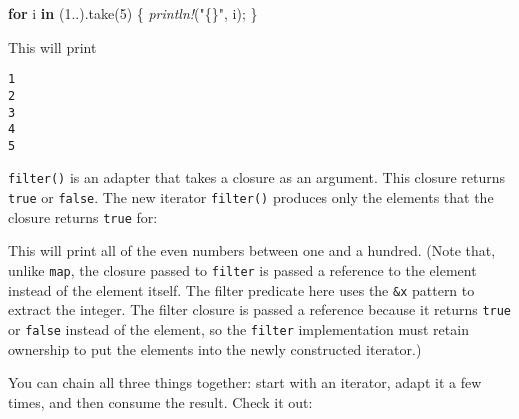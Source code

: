 \documentclass[a4paper,]{book}
\newenvironment{Shaded}{\begin{snugshade}}{\end{snugshade}}
\newcommand{\KeywordTok}[1]{\textcolor[rgb]{0.13,0.29,0.53}{\textbf{{#1}}}}
\newcommand{\DataTypeTok}[1]{\textcolor[rgb]{0.13,0.29,0.53}{{#1}}}
\newcommand{\DecValTok}[1]{\textcolor[rgb]{0.00,0.00,0.81}{{#1}}}
\newcommand{\StringTok}[1]{\textcolor[rgb]{0.31,0.60,0.02}{{#1}}}
\newcommand{\PreprocessorTok}[1]{\textcolor[rgb]{0.56,0.35,0.01}{\textit{{#1}}}}
\newcommand{\NormalTok}[1]{{#1}}
\begin{document}
\begin{Shaded}
\begin{Highlighting}[]
\KeywordTok{for} \NormalTok{i }\KeywordTok{in} \NormalTok{(}\DecValTok{1.}\NormalTok{.).take(}\DecValTok{5}\NormalTok{) \{}
    \PreprocessorTok{println!}\NormalTok{(}\StringTok{"\{\}"}\NormalTok{, i);}
\NormalTok{\}}
\end{Highlighting}
\end{Shaded}

This will print

\begin{verbatim}
1
2
3
4
5
\end{verbatim}

\texttt{filter()} is an adapter that takes a closure as an argument.
This closure returns \texttt{true} or \texttt{false}. The new iterator
\texttt{filter()} produces only the elements that the closure returns
\texttt{true} for:

\begin{Shaded}
\end{Shaded}

This will print all of the even numbers between one and a hundred. (Note
that, unlike \texttt{map}, the closure passed to \texttt{filter} is
passed a reference to the element instead of the element itself. The
filter predicate here uses the \texttt{\&x} pattern to extract the
integer. The filter closure is passed a reference because it returns
\texttt{true} or \texttt{false} instead of the element, so the
\texttt{filter} implementation must retain ownership to put the elements
into the newly constructed iterator.)

You can chain all three things together: start with an iterator, adapt
it a few times, and then consume the result. Check it out:

\begin{Shaded}
\end{Shaded}
\end{document}
